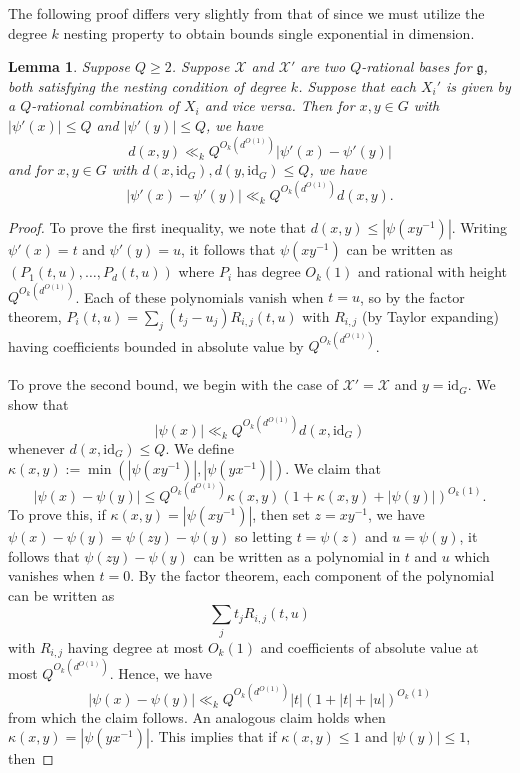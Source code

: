 \documentclass[11pt, a4paper]{amsart}
\theoremstyle{plain}
\theoremstyle{plain}
\newtheorem{lemma}{Lemma}
\theoremstyle{definition}
\theoremstyle{remark}
\numberwithin{equation}{section}
\numberwithin{lemma}{section}
\numberwithin{proposition}{section}
\numberwithin{corollary}{section}
\numberwithin{definition}{section}
\numberwithin{claim}{section}
\begin{document}
The following proof differs very slightly from that of \cite[Lemma A.4]{GT12} since we must utilize the degree $k$ nesting property to obtain bounds single exponential in dimension.
\begin{lemma}\label{l:distancecomparison}
Suppose $Q \ge 2$. Suppose $\mathcal{X}$ and $\mathcal{X}'$ are two $Q$-rational bases for $\mathfrak{g}$, both satisfying the nesting condition of degree $k$. Suppose that each $X_i'$ is given by a $Q$-rational combination of $X_i$ and vice versa. Then for $x, y \in G$ with $|\psi'(x)| \le Q$ and $|\psi'(y)| \le Q$, we have
$$d(x, y) \ll_k Q^{O_k(d^{O(1)})}|\psi'(x) - \psi'(y)|$$
and for $x, y \in G$ with $d(x, \mathrm{id}_G), d(y, \mathrm{id}_G) \le Q$, we have
$$|\psi'(x) - \psi'(y)| \ll_k Q^{O_k(d^{O(1)})} d(x, y).$$
\end{lemma}
\begin{proof}
To prove the first inequality, we note that $d(x, y) \le |\psi(xy^{-1})|$. Writing $\psi'(x) = t$ and $\psi'(y) = u$, it follows that $\psi(xy^{-1})$ can be written as $(P_1(t, u), \dots, P_d(t, u))$ where $P_i$ has degree $O_k(1)$ and rational with height $Q^{O_k(d^{O(1)})}$. Each of these polynomials vanish when $t = u$, so by the factor theorem, $P_i(t, u) = \sum_j (t_j - u_j) R_{i, j}(t, u)$ with $R_{i, j}$ (by Taylor expanding) having coefficients bounded in absolute value by $Q^{O_k(d^{O(1)})}$. \\\\
To prove the second bound, we begin with the case of $\mathcal{X}' = \mathcal{X}$ and $y = \mathrm{id}_G$. We show that
$$|\psi(x)| \ll_k Q^{O_k(d^{O(1)})} d(x, \mathrm{id}_G)$$
whenever $d(x, \mathrm{id}_G) \le Q$. 
We define $\kappa(x, y) := \min(|\psi(xy^{-1})|, |\psi(yx^{-1})|)$. We claim that
$$|\psi(x) - \psi(y)| \le Q^{O_k(d^{O(1)})}\kappa(x, y)(1 + \kappa(x, y) + |\psi(y)|)^{O_k(1)}.$$
To prove this, if $\kappa(x, y) = |\psi(xy^{-1})|$, then set $z = xy^{-1}$, we have $\psi(x) - \psi(y) = \psi(zy) - \psi(y)$ so letting $t = \psi(z)$ and $u = \psi(y)$, it follows that $\psi(zy) - \psi(y)$ can be written as a polynomial in $t$ and $u$ which vanishes when $t = 0$. By the factor theorem, each component of the polynomial can be written as
$$\sum_j t_j R_{i, j}(t, u)$$
with $R_{i, j}$ having degree at most $O_k(1)$ and coefficients of absolute value at most $Q^{O_k(d^{O(1)})}$. Hence, we have
$$|\psi(x) - \psi(y)| \ll_k Q^{O_k(d^{O(1)})} |t|(1 + |t| + |u|)^{O_k(1)}$$
from which the claim follows. An analogous claim holds when $\kappa(x, y) = |\psi(yx^{-1})|$. This implies that if $\kappa(x, y) \le 1$ and $|\psi(y)| \le 1$, then

\end{proof}
\end{document}
